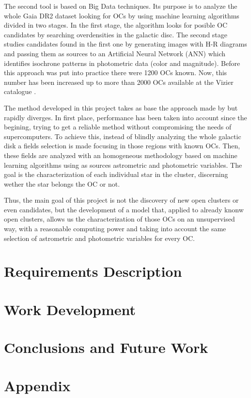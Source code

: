 \documentclass[11pt, a4paper, english]{book}
\begin{document}
The second tool is based on Big Data techniques. Its purpose is to analyze the whole Gaia DR2 dataset looking for OCs by using
machine learning algorithms divided in two stages. In the first stage, the algorithm looks for posible OC candidates by searching
overdensities in the galactic disc.
The second stage studies candidates found in the first one by generating images with H-R diagrams and passing them
as sources to an Artificial Neural Network (ANN) which identifies isochrone patterns in photometric data (color and magnitude).
Before this approach was put into practice there were 1200 OCs known. Now, this number has been increased up to more than 2000 OCs
available at the Vizier catalogue \cite[][\url{https://vizier.unistra.fr}]{ochsenbein2000vizier}.

The method developed in this project takes as base the approach made by \citeauthor{castro2020hunting} but rapidly diverges.
In first place, performance has been taken into account since the begining, trying to get a reliable method without compromising the
needs of supercomputers.
To achieve this, instead of blindly analyzing the whole galactic disk a fields selection is made focusing in those regions with known OCs.
Then, these fields are analyzed with an homogeneous methodology based on machine learning algorithms using as sources astrometric and
photometric variables. The goal is the characterization of each individual star in the cluster, discerning wether the star belongs the OC
or not.

Thus, the main goal of this project is not the discovery of new open clusters or even candidates, but the development of a model that,
applied to already knonw open clusters, allows us the characterization of those OCs on an unsupervised way, with a reasonable computing
power and taking into account the same selection of astrometric and photometric variables for every OC.

\chapter{Requirements Description}

\chapter{Work Development}

\chapter{Conclusions and Future Work}



\appendix
\chapter{Appendix}

\end{document}
